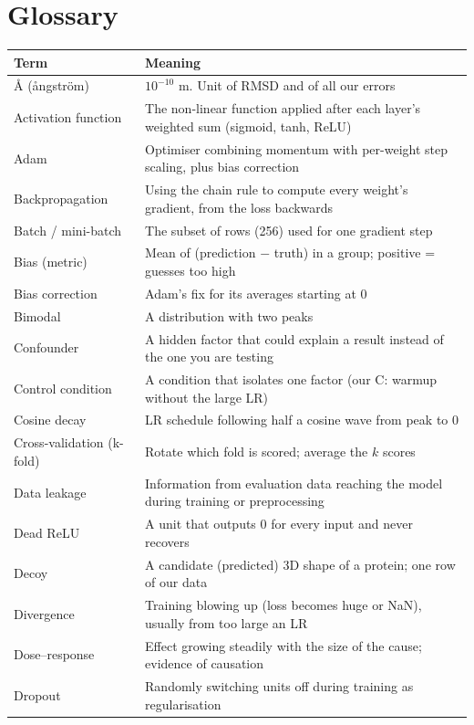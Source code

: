 \documentclass[11pt,a4paper]{article}
\begin{document}
\section{Glossary}
\label{sec:glossary}
\small
\begin{xltabular}{\linewidth}{@{}>{\raggedright\arraybackslash}p{4.2cm}Y@{}}
\toprule
Term & Meaning \\
\midrule
\endhead
\AA{} (ångström) & $10^{-10}$ m. Unit of RMSD and of all our errors \\
Activation function & The non-linear function applied after each layer's weighted sum (sigmoid, tanh, ReLU) \\
Adam & Optimiser combining momentum with per-weight step scaling, plus bias correction \\
Backpropagation & Using the chain rule to compute every weight's gradient, from the loss backwards \\
Batch / mini-batch & The subset of rows (256) used for one gradient step \\
Bias (metric) & Mean of (prediction $-$ truth) in a group; positive = guesses too high \\
Bias correction & Adam's fix for its averages starting at 0 \\
Bimodal & A distribution with two peaks \\
Confounder & A hidden factor that could explain a result instead of the one you are testing \\
Control condition & A condition that isolates one factor (our C: warmup without the large LR) \\
Cosine decay & LR schedule following half a cosine wave from peak to 0 \\
Cross-validation (k-fold) & Rotate which fold is scored; average the $k$ scores \\
Data leakage & Information from evaluation data reaching the model during training or preprocessing \\
Dead ReLU & A unit that outputs 0 for every input and never recovers \\
Decoy & A candidate (predicted) 3D shape of a protein; one row of our data \\
Divergence & Training blowing up (loss becomes huge or NaN), usually from too large an LR \\
Dose--response & Effect growing steadily with the size of the cause; evidence of causation \\
Dropout & Randomly switching units off during training as regularisation \\

\end{xltabular}
\end{document}
